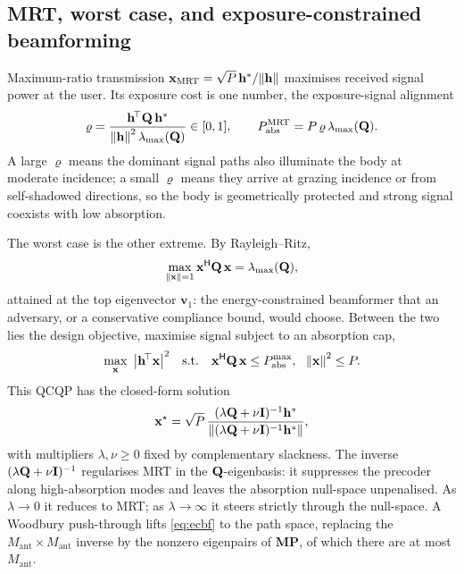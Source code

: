 \subsection{MRT, worst case, and exposure-constrained beamforming}

Maximum-ratio transmission $\mathbf{x}_{\mathrm{MRT}}=\sqrt P\,\mathbf h^*/\norm{\mathbf h}$
maximises received signal power at the user. Its exposure cost is one
number, the exposure-signal alignment
\begin{equation}\label{eq:rho}
  \varrho=\frac{\mathbf h^{\!\top}\mathbf{Q}\,\mathbf h^*}
              {\norm{\mathbf h}^2\,\lambda_{\max}(\mathbf{Q})}\in[0,1],
  \qquad
  P_{\mathrm{abs}}^{\mathrm{MRT}}=P\,\varrho\,\lambda_{\max}(\mathbf{Q}).
\end{equation}
A large $\varrho$ means the dominant signal paths also illuminate the
body at moderate incidence; a small $\varrho$ means they arrive at
grazing incidence or from self-shadowed directions, so the body is
geometrically protected and strong signal coexists with low absorption.

The worst case is the other extreme. By Rayleigh--Ritz,
\begin{equation}\label{eq:worstcase}
  \max_{\norm{\mathbf{x}}=1}\mathbf{x}^{\mathsf{H}}\mathbf{Q}\,\mathbf{x}=\lambda_{\max}(\mathbf{Q}),
\end{equation}
attained at the top eigenvector $\mathbf v_1$: the energy-constrained
beamformer that an adversary, or a conservative compliance bound, would
choose. Between the two lies the design objective, maximise signal
subject to an absorption cap,
\begin{equation}\label{eq:QCQP}
  \max_{\mathbf{x}}\ \abs{\mathbf h^{\!\top}\mathbf{x}}^2
  \quad\text{s.t.}\quad
  \mathbf{x}^{\mathsf{H}}\mathbf{Q}\,\mathbf{x}\le P_{\mathrm{abs}}^{\max},\ \ \norm{\mathbf{x}}^2\le P.
\end{equation}
This QCQP has the closed-form solution
\begin{equation}\label{eq:ecbf}
  \mathbf{x}^\star=\sqrt P\,
    \frac{(\lambda\mathbf{Q}+\nu\mathbf I)^{-1}\mathbf h^*}
         {\norm{(\lambda\mathbf{Q}+\nu\mathbf I)^{-1}\mathbf h^*}},
\end{equation}
with multipliers $\lambda,\nu\ge 0$ fixed by complementary slackness.
The inverse $(\lambda\mathbf{Q}+\nu\mathbf I)^{-1}$ regularises MRT in the
$\mathbf{Q}$-eigenbasis: it suppresses the precoder along high-absorption
modes and leaves the absorption null-space unpenalised. As
$\lambda\to 0$ it reduces to MRT; as $\lambda\to\infty$ it steers
strictly through the null-space. A Woodbury push-through lifts
\cref{eq:ecbf} to the path space, replacing the
$M_{\mathrm{ant}}\times M_{\mathrm{ant}}$ inverse by the nonzero
eigenpairs of $\mathbf M\mathbf P$, of which there are at most
$M_{\mathrm{ant}}$.

